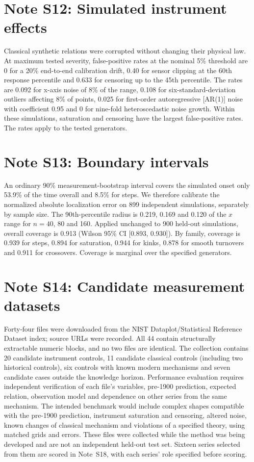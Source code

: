 \documentclass{article}
\begin{document}
\section{Note S12: Simulated instrument effects}

Classical synthetic relations were corrupted without changing their physical law. At maximum tested severity, false-positive rates at the nominal 5\% threshold are 0 for a 20\% end-to-end calibration drift, 0.40 for sensor clipping at the 60th response percentile and 0.633 for censoring up to the 45th percentile. The rates are 0.092 for x-axis noise of 8\% of the range, 0.108 for six-standard-deviation outliers affecting 8\% of points, 0.025 for first-order autoregressive [AR(1)] noise with coefficient 0.95 and 0 for nine-fold heteroscedastic noise growth. Within these simulations, saturation and censoring have the largest false-positive rates. The rates apply to the tested generators.

\section{Note S13: Boundary intervals}

An ordinary 90\% measurement-bootstrap interval covers the simulated onset only 53.9\% of the time overall and 8.5\% for steps. We therefore calibrate the normalized absolute localization error on 899 independent simulations, separately by sample size. The 90th-percentile radius is 0.219, 0.169 and 0.120 of the $x$ range for $n = 40$, 80 and 160. Applied unchanged to 900 held-out simulations, overall coverage is 0.913 (Wilson 95\% CI [0.893, 0.930]). By family, coverage is 0.939 for steps, 0.894 for saturation, 0.944 for kinks, 0.878 for smooth turnovers and 0.911 for crossovers. Coverage is marginal over the specified generators.

\section{Note S14: Candidate measurement datasets}

Forty-four files were downloaded from the NIST Dataplot/Statistical Reference Dataset index; source URLs were recorded. All 44 contain structurally extractable numeric blocks, and no two files are identical. The collection contains 20 candidate instrument controls, 11 candidate classical controls (including two historical controls), six controls with known modern mechanisms and seven candidate cases outside the knowledge horizon. Performance evaluation requires independent verification of each file's variables, pre-1900 prediction, expected relation, observation model and dependence on other series from the same mechanism. The intended benchmark would include complex shapes compatible with the pre-1900 prediction, instrument saturation and censoring, altered noise, known changes of classical mechanism and violations of a specified theory, using matched grids and errors. These files were collected while the method was being developed and are not an independent held-out test set. Sixteen series selected from them are scored in Note~S18, with each series' role specified before scoring.
\end{document}
